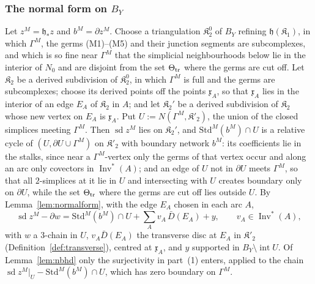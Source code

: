 \subsubsection*{The normal form on \texorpdfstring{$B_Y$}{BY}}
Let $z^M=\mathfrak h_*z$ and $b^M=\partial z^M$. Choose a triangulation $\mathfrak K_2^0$ of $B_Y$ refining $\mathfrak h(\mathfrak K_1)$, in which
$\Gamma^M$, the germs (M1)--(M5) and their junction segments are subcomplexes, and which is so fine near $\Gamma^M$ that
the simplicial neighbourhoods below lie in the interior of $N_0$ and are disjoint from the set
$\Theta_{\rm tr}$ where the germs are cut off. Let $\mathfrak K_2$ be a derived subdivision of
$\mathfrak K_2^0$, in which $\Gamma^M$ is full and the germs are subcomplexes; choose its derived points off the points
$\mathfrak x_A$, so that $\mathfrak x_A$ lies in the interior of an edge $E_A$ of $\mathfrak K_2$ in $A$; and let
$\mathfrak K_2'$ be a derived subdivision of $\mathfrak K_2$ whose new vertex on $E_A$ is $\mathfrak x_A$. Put
$U:=N(\Gamma^M,\mathfrak K'_2)$, the union of the closed simplices meeting $\Gamma^M$. Then $\operatorname{sd}z^M$ lies on
$\mathfrak K_2'$, and $\mathrm{Std}^M(b^M)\cap U$ is a relative cycle of $(U,\partial U\cup\Gamma^M)$ on $\mathfrak K'_2$ with
boundary network $b^M$: its coefficients lie in the stalks, since near a $\Gamma^M$-vertex only the germs of that vertex
occur and along an arc only covectors in $\operatorname{Inv}^*(A)$; and an edge of $U$ not in $\partial U$ meets
$\Gamma^M$, so that all $2$-simplices at it lie in $U$ and intersecting with $U$ creates boundary only on $\partial U$,
while the set $\Theta_{\rm tr}$ where the germs are cut off lies outside $U$. By
Lemma~\ref{lem:normalform}, with the edge $E_A$ chosen in each arc $A$,
\begin{equation}\label{eq:nf1}
\operatorname{sd}z^M-\partial w=\mathrm{Std}^M(b^M)\cap U+\sum_Av_A\,\bar D(E_A)+y,\qquad v_A\in\operatorname{Inv}^*(A),
\end{equation}
with $w$ a $3$-chain in $U$, $v_A\bar D(E_A)$ the transverse disc at $E_A$ in $\mathfrak K'_2$ (Definition~\ref{def:transverse}), centred at $\mathfrak x_A$, and $y$
supported in $B_Y\setminus\operatorname{int}U$. Of Lemma~\ref{lem:nbhd} only the surjectivity in part~(1) enters, applied to the chain
$\operatorname{sd}z^M|_U-\mathrm{Std}^M(b^M)\cap U$, which has zero boundary on $\Gamma^M$.

